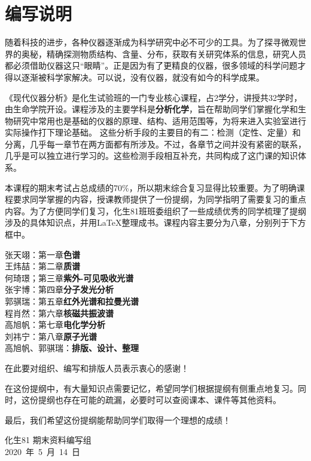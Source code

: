 \chapter*{编写说明}

随着科技的进步，各种仪器逐渐成为科学研究中必不可少的工具。为了探寻微观世界的奥秘，精确探测物质结构、含量、分布，获取有关研究体系的信息，研究人员都必须借助仪器这只“眼睛”。正是因为有了更精良的仪器，很多领域的科学问题才得以逐渐被科学家解决。可以说，没有仪器，就没有如今的科学成果。

《现代仪器分析》是化生试验班的一门专业核心课程，占2学分，讲授共32学时，由生命学院开设。课程涉及的主要学科是\textbf{分析化学}，旨在帮助同学们掌握化学和生物研究中常用也是基础的仪器的原理、结构、适用范围等，为将来进入实验室进行实际操作打下理论基础。
这些分析手段的主要目的有二：检测（定性、定量）和分离，几乎每一章节在两方面都有所涉及。不过，各章节之间并没有紧密的联系，几乎是可以独立进行学习的。这些检测手段相互补充，共同构成了这门课的知识体系。

本课程的期末考试占总成绩的70\%，所以期末综合复习显得比较重要。为了明确课程要求同学掌握的内容，授课教师提供了一份提纲，为同学指明了需要复习的重点内容。为了方便同学们复习，化生81班班委组织了一些成绩优秀的同学梳理了提纲涉及的具体知识点，并用\LaTeX 整理成书。课程内容主要分为八章，分别列于下方框中。
\begin{tcolorbox}[title={\bfseries 编写组成员}]
	 张天翊：第一章\hspace{1em}\textbf{色谱}\\
	 王炜喆：第二章\hspace{1em}\textbf{质谱}\\
	 何琦璟；第三章\hspace{1em}\textbf{紫外-可见吸收光谱}\\
	 张宇博：第四章\hspace{1em}\textbf{分子发光分析}\\
	 郭骐瑞：第五章\hspace{1em}\textbf{红外光谱和拉曼光谱}\\
	 程肖然：第六章\hspace{1em}\textbf{核磁共振波谱}\\
	 高旭帆：第七章\hspace{1em}\textbf{电化学分析}\\
	 刘祎宁：第八章\hspace{1em}\textbf{原子光谱}\\
	 高旭帆、郭骐瑞：\textbf{排版、设计、整理}
\end{tcolorbox}
在此要对组织、编写和排版人员表示衷心的感谢！

在这份提纲中，有大量知识点需要记忆，希望同学们根据提纲有侧重点地复习。同时，这份提纲也存在可能的疏漏，必要时可以查阅课本、课件等其他资料。

最后，我们希望这份提纲能帮助同学们取得一个理想的成绩！

\vskip 1.5cm

\begin{flushright}
	化生81 期末资料编写组\\
	2020\ 年\ 5\ 月\ 14\ 日
\end{flushright}